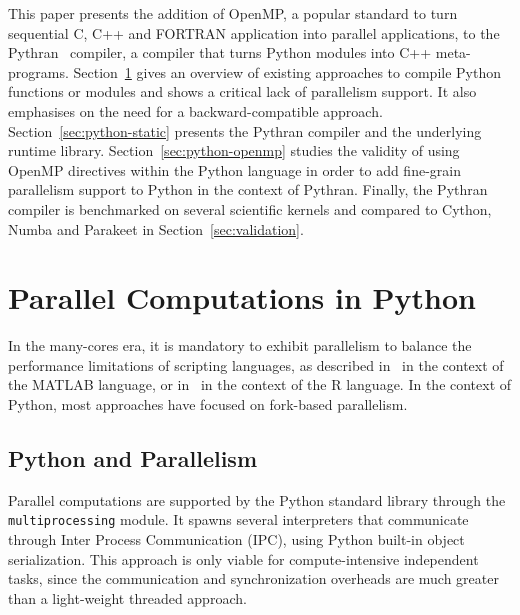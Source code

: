 \documentclass[conference]{IEEEtran}
\begin{document}
This paper presents the addition of OpenMP, a popular standard to turn
sequential C, C++ and FORTRAN application into parallel applications, to the
Pythran~\cite{pythran2013} compiler, a compiler that turns Python modules into
C++ meta-programs.  Section~\ref{sec:python-parallel} gives an overview of
existing approaches to compile Python functions or modules and shows a critical
lack of parallelism support. It also emphasises on the need for a
backward-compatible approach. Section~\ref{sec:python-static} presents the
Pythran compiler and the underlying runtime library.
Section~\ref{sec:python-openmp} studies the validity of using OpenMP directives
within the Python language in
order to add fine-grain parallelism support to Python in the context of Pythran.
Finally, the Pythran compiler is benchmarked on several scientific kernels and
compared to Cython, Numba and Parakeet in Section~\ref{sec:validation}.

\section{Parallel Computations in Python}\label{sec:python-parallel}

In the many-cores era, it is mandatory to exhibit parallelism to balance the
performance limitations of scripting languages, as described in~\cite{choy05}
in the context of the MATLAB language, or in~\cite{mals07} in the context of
the R language. In the context of Python, most approaches have focused on
fork-based parallelism.

\subsection{Python and Parallelism}

Parallel computations are supported by the Python standard library through the
\texttt{multiprocessing} module. It spawns several interpreters that
communicate through Inter Process Communication (IPC), using Python built-in
object serialization. This approach is only viable for compute-intensive
independent tasks, since the communication and synchronization overheads are
much greater than a light-weight threaded approach.
\end{document}
